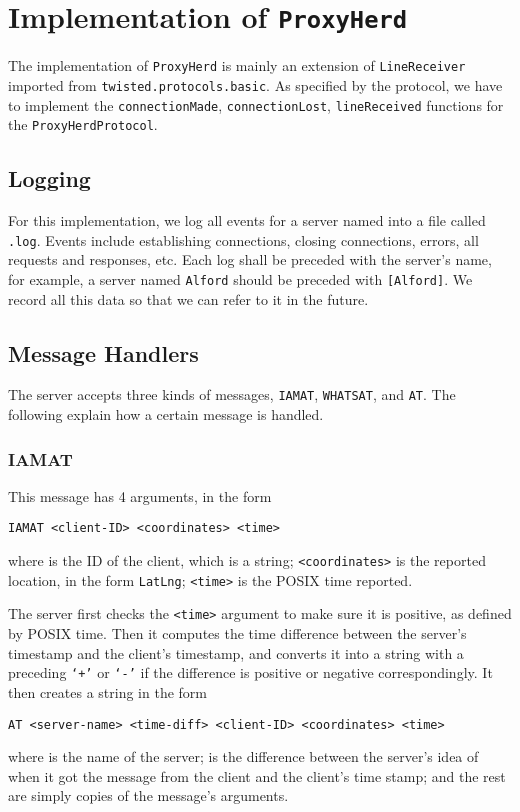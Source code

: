 \documentclass[letterpaper,twocolumn,10pt]{article}
\begin{document}
\section{Implementation of {\tt ProxyHerd}}

The implementation of {\tt ProxyHerd} is mainly an extension of {\tt LineReceiver} imported from {\tt twisted.protocols.basic}. As specified by the protocol, we have to implement the {\tt connectionMade}, {\tt connectionLost}, {\tt lineReceived} functions for the {\tt ProxyHerdProtocol}.

\subsection{Logging}

For this implementation, we log all events for a server named {\tt <server-name>} into a file called {\tt <server-name>.log}. Events include establishing connections, closing connections, errors, all requests and responses, etc. Each log shall be preceded with the server's name, for example, a server named {\tt Alford} should be preceded with {\tt [Alford]}. We record all this data so that we can refer to it in the future.

\subsection{Message Handlers}

The server accepts three kinds of messages, {\tt IAMAT}, {\tt WHATSAT}, and {\tt AT}. The following explain how a certain message is handled.

\subsubsection{IAMAT}

This message has 4 arguments, in the form
\begin{center}
{\tt \small IAMAT <client-ID> <coordinates> <time>}
\end{center}
where {\tt <client-ID>} is the ID of the client, which is a string; {\tt <coordinates>} is the reported location, in the form {\tt LatLng}; {\tt <time>} is the POSIX time reported.

The server first checks the {\tt <time>} argument to make sure it is positive, as defined by POSIX time. Then it computes the time difference between the server's timestamp and the client's timestamp, and converts it into a string with a preceding {\tt `+'} or {\tt `-'} if the difference is positive or negative correspondingly. It then creates a string in the form
\begin{center}
{\tt \small AT <server-name> <time-diff> <client-ID> <coordinates> <time>}
\end{center}
where {\tt <server-name>} is the name of the server; {\tt <time-diff>} is the difference between the server's idea of when it got the message from the client and the client's time stamp; and the rest are simply copies of the message's arguments.
\end{document}
